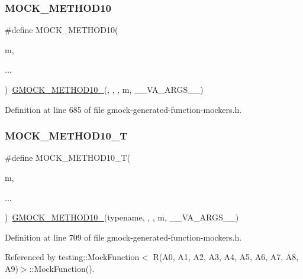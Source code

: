 \subsubsection{\texorpdfstring{M\+O\+C\+K\+\_\+\+M\+E\+T\+H\+O\+D10}{MOCK\_METHOD10}}
{\footnotesize\ttfamily \#define M\+O\+C\+K\+\_\+\+M\+E\+T\+H\+O\+D10(\begin{DoxyParamCaption}\item[{}]{m,  }\item[{}]{... }\end{DoxyParamCaption})~\hyperlink{gmock-generated-function-mockers_8h_a81a48223a8771de36ef92ac6d56f6e81}{G\+M\+O\+C\+K\+\_\+\+M\+E\+T\+H\+O\+D10\+\_\+}(, , , m, \+\_\+\+\_\+\+V\+A\+\_\+\+A\+R\+G\+S\+\_\+\+\_\+)}



Definition at line 685 of file gmock-\/generated-\/function-\/mockers.\+h.

\mbox{\label{gmock-generated-function-mockers_8h_aa28723ba52933b5ea9a4ffa1a73d15e1}} 
\subsubsection{\texorpdfstring{M\+O\+C\+K\+\_\+\+M\+E\+T\+H\+O\+D10\+\_\+T}{MOCK\_METHOD10\_T}}
{\footnotesize\ttfamily \#define M\+O\+C\+K\+\_\+\+M\+E\+T\+H\+O\+D10\+\_\+T(\begin{DoxyParamCaption}\item[{}]{m,  }\item[{}]{... }\end{DoxyParamCaption})~\hyperlink{gmock-generated-function-mockers_8h_a81a48223a8771de36ef92ac6d56f6e81}{G\+M\+O\+C\+K\+\_\+\+M\+E\+T\+H\+O\+D10\+\_\+}(typename, , , m, \+\_\+\+\_\+\+V\+A\+\_\+\+A\+R\+G\+S\+\_\+\+\_\+)}



Definition at line 709 of file gmock-\/generated-\/function-\/mockers.\+h.



Referenced by testing\+::\+Mock\+Function$<$ R(\+A0, A1, A2, A3, A4, A5, A6, A7, A8, A9)$>$\+::\+Mock\+Function().

